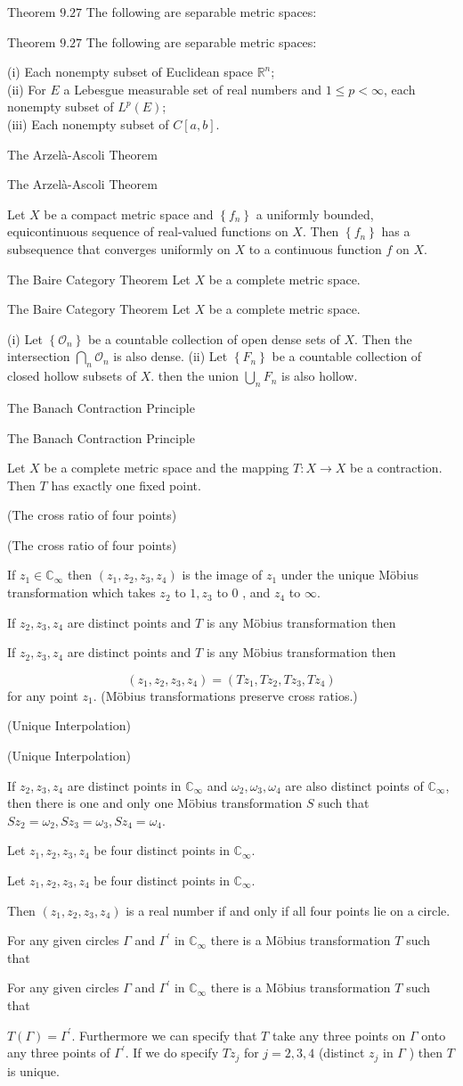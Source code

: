\documentclass[17pt]{extarticle}
\newcommand{\boxset}[2]{\begin{mdframed}[style=darkQuesion]
#1
\end{mdframed}
\newpage
\begin{mdframed}[style=darkQuesion]
#1
  \end{mdframed}
\begin{mdframed}[style=darkAnswer]
#2
  \end{mdframed}
  \newpage
}
\begin{document}
\boxset{Theorem $9.27$ The following are separable metric spaces:}
{
(i) Each nonempty subset of Euclidean space $\mathbb{R}^{n}$;\[\ \]
(ii) For $E$ a Lebesgue measurable set of real numbers and $1 \leq p<\infty$, each nonempty subset of $L^{p}(E)$;\[\ \]
(iii) Each nonempty subset of $C[a, b]$.\[\ \]
}
\boxset{The Arzelà-Ascoli Theorem}
{Let $X$ be a compact metric space and $\left\{f_{n}\right\}$ a uniformly bounded, equicontinuous sequence of real-valued functions on $X$. Then $\left\{f_{n}\right\}$ has a subsequence that converges uniformly on $X$ to a continuous function $f$ on $X$.}
\boxset{The Baire Category Theorem Let $X$ be a complete metric space.}
{
(i) Let $\left\{\mathcal{O}_{n}\right\}$ be a countable collection of open dense sets of $X$. Then the intersection $\bigcap_{n} \mathcal{O}_{n}$ is also dense.
(ii) Let $\left\{F_{n}\right\}$ be a countable collection of closed hollow subsets of $X$. then the union $\bigcup_{n} F_{n}$ is also hollow.\[\ \]
}
\boxset{The Banach Contraction Principle}
{Let $X$ be a complete metric space and the mapping $T: X \rightarrow X$ be a contraction. Then $T$ has exactly one fixed point.}
\boxset{(The cross ratio of four points)}
{If $z_{1} \in \mathbb{C}_{\infty}$ then $\left(z_{1}, z_{2}, z_{3}, z_{4}\right)$ is the image of $z_{1}$ under the unique Möbius transformation which takes $z_{2}$ to $1, z_{3}$ to 0 , and $z_{4}$ to $\infty$.}

\boxset{If $z_{2}, z_{3}, z_{4}$ are distinct points and $T$ is any Möbius transformation then}
{
$$
\left(z_{1}, z_{2}, z_{3}, z_{4}\right)=\left(T z_{1}, T z_{2}, T z_{3}, T z_{4}\right)
$$
for any point $z_{1}$. (Möbius transformations preserve cross ratios.)
}
\boxset{(Unique Interpolation)}
{If $z_{2}, z_{3}, z_{4}$ are distinct points in $\mathbb{C}_{\infty}$ and $\omega_{2}, \omega_{3}, \omega_{4}$ are also distinct points of $\mathbb{C}_{\infty}$, then there is one and only one Möbius transformation $S$ such that $S z_{2}=\omega_{2}, S z_{3}=\omega_{3}, S z_{4}=\omega_{4}$.}

\boxset{Let $z_{1}, z_{2}, z_{3}, z_{4}$ be four distinct points in $\mathbb{C}_{\infty}$.}
{Then $\left(z_{1}, z_{2}, z_{3}, z_{4}\right)$ is a real number if and only if all four points lie on a circle.}


\boxset{For any given circles $\Gamma$ and $\Gamma^{\prime}$ in $\mathbb{C}_{\infty}$ there is a Möbius transformation $T$ such that}
{$T(\Gamma)=\Gamma^{\prime}$. Furthermore we can specify that $T$ take any three points on $\Gamma$ onto any three points of $\Gamma^{\prime}$. If we do specify $T z_{j}$ for $j=2,3,4$ (distinct $z_{j}$ in $\Gamma$ ) then $T$ is unique.}
\end{document}
